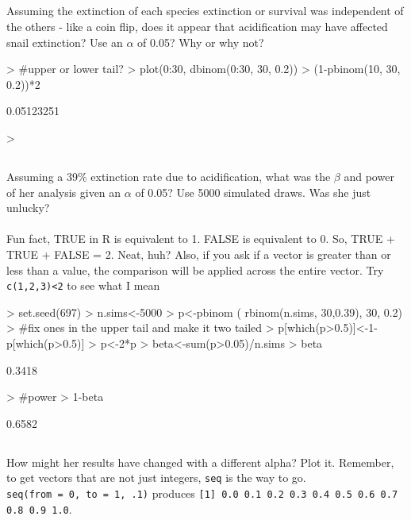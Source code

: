\documentclass{article}
\begin{document}
\subsection{}Assuming the extinction of each species extinction or survival was independent of the others - like a coin flip, does it appear that acidification may have affected snail extinction? Use an $\alpha$ of 0.05?   Why or why not?
\begin{Schunk}
\begin{Sinput}
> #upper or lower tail?
> plot(0:30, dbinom(0:30, 30, 0.2))
> (1-pbinom(10, 30, 0.2))*2
\end{Sinput}
\begin{Soutput}
[1] 0.05123251
\end{Soutput}
\begin{Sinput}
> 
\end{Sinput}
\end{Schunk}
\subsection{}Assuming a 39\% extinction rate due to acidification, what was the $\beta$ and power of her analysis given an $\alpha$ of 0.05?  Use 5000 simulated draws.  Was she just unlucky?\\
\hfill \\
Fun fact, TRUE in R is equivalent to 1.  FALSE is equivalent to 0.  So, TRUE + TRUE + FALSE = 2.  Neat, huh?  Also, if you ask if a vector is greater than or less than a value, the comparison will be applied across the entire vector.  Try {\tt c(1,2,3)<2} to see what I mean
\begin{Schunk}
\begin{Sinput}
> set.seed(697)
> n.sims<-5000
> p<-pbinom ( rbinom(n.sims, 30,0.39), 30, 0.2)
> #fix ones in the upper tail and make it two tailed
> p[which(p>0.5)]<-1-p[which(p>0.5)]
> p<-2*p
> beta<-sum(p>0.05)/n.sims
> beta
\end{Sinput}
\begin{Soutput}
[1] 0.3418
\end{Soutput}
\begin{Sinput}
> #power
> 1-beta
\end{Sinput}
\begin{Soutput}
[1] 0.6582
\end{Soutput}
\end{Schunk}

\subsection{}How might her results have changed with a different alpha?  Plot it.  Remember, to get vectors that are not just integers, {\tt seq} is the way to go.\\  {\tt seq(from = 0, to = 1, .1)} produces {\tt [1] 0.0 0.1 0.2 0.3 0.4 0.5 0.6 0.7 0.8 0.9 1.0}.
\end{document}
